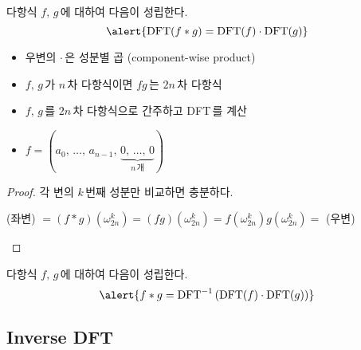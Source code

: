 \begin{frame}
    \begin{theorem}
        다항식 \(f,\, g\)\,에 대하여 다음이 성립한다.
        \vspace*{-5px}
        \[
            \alert{\DFT(f \ast g) = \DFT(f) \cdot \DFT(g)}
        \]
        \vspace*{-15px}
    \end{theorem}

    \begin{itemize}
        \setlength{\itemsep}{1em}
        \item<2-> 우변의 \(\cdot\)\,은 성분별 곱 (component-wise product)
        \item<3-> \(f,\,g\)\,가 \(n\)\,차 다항식이면 \(fg\)\,는 \(2n\)\,차 다항식
        \item<4-> \(f,\,g\)\,를 \(2n\)\,차 다항식으로 간주하고 DFT\,를 계산
        \item<4-> \(f = (a_0,\,\dots,\,a_{n-1},\, \underbrace{0,\, \dots,\, 0}_{n\,\text{개}})\)
    \end{itemize}
\end{frame}


\begin{frame}
    \begin{proof}
        각 변의 \(k\)\,번째 성분만 비교하면 충분하다.
        \begin{center}
            (좌변) \(= (f \ast g)(\omega_{2n}^k) = (fg)(\omega_{2n}^k) = f(\omega_{2n}^k)g(\omega_{2n}^k) = \) (우변)
        \end{center}
    \end{proof}

    \pause

    \begin{corollary}
        다항식 \(f,\, g\)\,에 대하여 다음이 성립한다.
        \vspace*{-5px}
        \[
            \alert{f \ast g = \DFT\inv\left(\DFT(f) \cdot \DFT(g)\right)}
        \]
        \vspace*{-15px}
    \end{corollary}
\end{frame}

\subsection{Inverse DFT}

